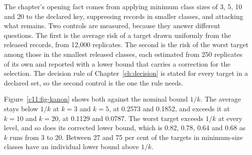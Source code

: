 The chapter's opening fact comes from applying minimum class sizes of 3, 5, 10 and
20 to the declared key, suppressing records in smaller classes, and attacking what
remains. Two controls are measured, because they answer different questions. The
first is the average risk of a target drawn uniformly from the released records,
from 12,000 replicates. The second is the risk of the worst target among those in
the smallest released classes, each estimated from 250 replicates of its own and
reported with a lower bound that carries a correction for the selection.
The decision rule of Chapter~\ref{ch:decision} is stated for every target in a
declared set, so the second control is the one the rule needs.

Figure~\ref{c11:fig-kanon} shows both against the nominal bound $1/k$. The average
stays below $1/k$ at $k = 3$ and $k = 5$, at 0.2573 and 0.1852, and exceeds it at
$k = 10$ and $k = 20$, at 0.1129 and 0.0787. The worst target exceeds $1/k$ at every
level, and so does its corrected lower bound, which is 0.82, 0.78, 0.64 and 0.68 as
$k$ runs from 3 to 20. Between 27 and 75 per cent of the targets in minimum-size
classes have an individual lower bound above $1/k$.

